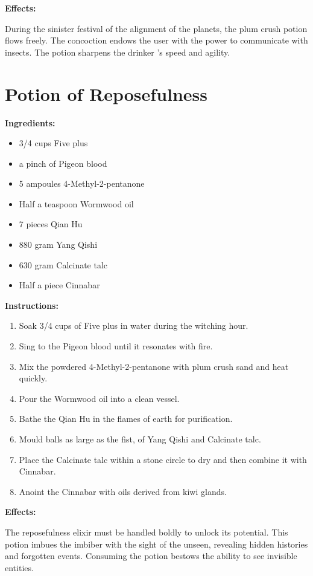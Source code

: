 \documentclass{article}
\begin{document}
\textbf{Effects:}

During the sinister festival of the alignment of the planets, the plum crush potion flows freely. The concoction endows the user with the power to communicate with insects. The potion sharpens the drinker 's speed and agility.

\newpage
\section*{Potion of Reposefulness}

\textbf{Ingredients:}

\begin{itemize}
  \item 3/4 cups Five plus
  \item a pinch of Pigeon blood
  \item 5 ampoules 4-Methyl-2-pentanone
  \item Half a teaspoon Wormwood oil
  \item 7 pieces Qian Hu
  \item 880 gram Yang Qishi
  \item 630 gram Calcinate talc
  \item Half a piece Cinnabar
\end{itemize}

\textbf{Instructions:}

\begin{enumerate}
  \item Soak 3/4 cups of Five plus in water during the witching hour.
  \item Sing to the Pigeon blood until it resonates with fire.
  \item Mix the powdered 4-Methyl-2-pentanone with plum crush sand and heat quickly.
  \item Pour the Wormwood oil into a clean vessel.
  \item Bathe the Qian Hu in the flames of earth for purification.
  \item Mould balls as large as the fist, of Yang Qishi and Calcinate talc.
  \item Place the Calcinate talc within a stone circle to dry and then combine it with Cinnabar.
  \item Anoint the Cinnabar with oils derived from kiwi glands.
\end{enumerate}

\textbf{Effects:}

The reposefulness elixir must be handled boldly to unlock its potential. This potion imbues the imbiber with the sight of the unseen, revealing hidden histories and forgotten events. Consuming the potion bestows the ability to see invisible entities.
\end{document}
